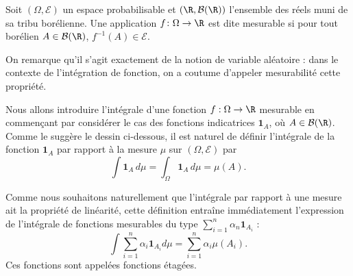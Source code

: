 \begin{definition}{}{}
	Soit $(\Omega,\mathcal{E})$ un espace probabilisable et $(\R,\mathcal{B}(\R))$ l'ensemble des réels muni de sa tribu borélienne. 
	Une application $f \colon \Omega \to \R $ est dite mesurable si pour tout borélien $A \in \mathcal{B}(\R)$, $f^{-1}(A) \in \mathcal{E}$.
\end{definition}

\noindent
On remarque qu'il s'agit exactement de la notion de variable aléatoire : dans le contexte de l'intégration de fonction, on a coutume d'appeler mesurabilité cette propriété.

\vspace{3mm}

Nous allons introduire l'intégrale d'une fonction $f:\Omega \to \R$ mesurable en commençant par considérer le cas des fonctions indicatrices $\textbf{1}_A$, où $A\in \mathcal{B}(\R)$. Comme le suggère le dessin ci-dessous, il est naturel de définir l'intégrale de la fonction $\textbf{1}_A$ par rapport à la mesure $\mu$ sur $(\Omega,\mathcal{E})$ par
	$$\int \textbf{1}_A \,d\mu = \int_\Omega \textbf{1}_A \,d\mu = \mu(A).$$
\begin{center}
\end{center}

Comme nous souhaitons naturellement que l'intégrale par rapport à une mesure ait la propriété de linéarité, cette définition entraîne immédiatement l'expression de l'intégrale de fonctions mesurables du type $\sum_{i=1}^n \alpha_n \textbf{1}_{A_i}$ :
	$$\int \sum_{i=1}^n \alpha_i \textbf{1}_{A_i} d\mu =  \sum_{i=1}^n \alpha_i \mu(A_i).$$
Ces fonctions sont appelées fonctions étagées.




\begin{center}
\end{center}


